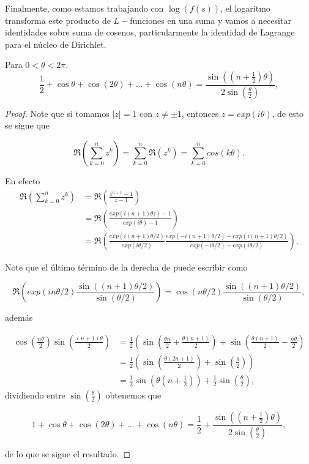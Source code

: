  Finalmente, como estamos trabajando con $\log(f(s))$, el logaritmo transforma este producto de $L-$funciones en una suma y vamos a necesitar identidades sobre suma de cosenos, particularmente la identidad de Lagrange para el núcleo de Dirichlet.

 \begin{theorem}
Para $0 < \theta < 2\pi$.
     \[
    \frac{1}{2} + \cos \theta + \cos(2\theta) + \dots + \cos(n\theta) = \frac{\sin\left((n + \frac{1}{2})\theta\right)}{2 \sin\left(\frac{\theta}{2}\right)},
    \]
 \end{theorem}

 \begin{proof}
     Note que si tomamos $|z|=1$ con $z\neq \pm 1$, entonces $z=exp(i\theta)$, de esto se sigue que

    $$\Re\left(\sum_{k=0}^{n} z^k\right)=\sum_{k=0}^{n} \Re(z^k)=\sum_{k=0}^{n}cos(k\theta).$$

    En efecto
    \begin{align*}
      \Re\left(\sum_{k=0}^{n} z^k\right)&=\Re\left(\frac{z^{n+1}-1}{z-1}\right)\\
      &=\Re\left(\frac{exp\left(i(n+1)\theta)\right) -1}{exp(i\theta)-1}\right)\\
      &=\Re\left(\frac{exp(i(n+1)\theta/2)}{exp(i\theta/2)}\frac{exp(-i(n+1)\theta/2)-exp(i(n+1)\theta/2)}{exp(-i\theta/2)-exp(i\theta/2)}\right)
    .\end{align*}

   Note que el último término de la derecha  de puede escribir como

   $$\Re\left(exp(in\theta/2)\frac{\sin\left((n+1)\theta/2\right)}{\sin(\theta/2)}\right)=\cos(n\theta/2)\frac{\sin((n+1)\theta/2)}{\sin(\theta/2)},$$

   además
   
   $$
\begin{aligned}
\cos \left(\frac{n \theta}{2}\right) \sin \left(\frac{(n+1) \theta}{2}\right)&=\frac{1}{2}\left(\sin \left(\frac{\theta n}{2}+\frac{\theta(n+1)}{2}\right)+\sin \left(\frac{\theta(n+1)}{2}-\frac{n \theta}{2}\right)\right. \\
& =\frac{1}{2}\left(\sin \left(\frac{\theta(2 n+1)}{2}\right)+\sin \left(\frac{\theta}{2}\right)\right) \\
& =\frac{1}{2} \sin \left(\theta\left(n+\frac{1}{2}\right)\right)+\frac{1}{2} \sin \left(\frac{\theta}{2}\right),
\end{aligned}
$$
dividiendo entre $\sin\left(\displaystyle\frac{\theta}{2}\right)$ obtenemos que

\[
    1 + \cos \theta + \cos(2\theta) + \dots + \cos(n\theta) = \frac{1}{2} + \frac{\sin\left((n + \frac{1}{2})\theta\right)}{2 \sin\left(\frac{\theta}{2}\right)},
    \]

de lo que se sigue el resultado.
 \end{proof}

